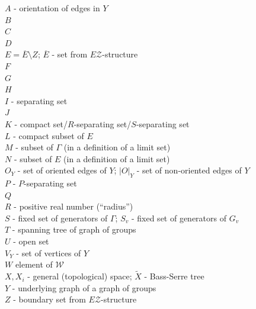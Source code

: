 \documentclass[12pt, a4paper]{article}
\newcommand{\8}{\infty}
\newcommand{\abs}[1]{\left| #1 \right|}
\theoremstyle{break}
\theoremstyle{defbreak}
\newcommand{\ol}[1]{\overline{#1}}
\newcommand{\wtl}[1]{\widetilde{#1}}
\begin{document}
{$A$ - orientation of edges in $Y$\\
$B$\\
$C$\\
$D$\\
$E = \ol{E}\setminus Z$; $\ol{E}$ - set from $E\mathcal{Z}$-structure\\
$F$\\
$G$\\
$H$\\
$I$ - separating set\\
$J$\\
$K$ - compact set/$R$-separating set/$S$-separating set\\
$L$ - compact subset of $E$\\
$M$ - subset of $\Gamma$ (in a definition of a limit set)\\
$N$ - subset of $E$ (in a definition of a limit set)\\
$O_Y$ - set of oriented edges of $Y$; $\abs{O}_Y$ - set of non-oriented edges of $Y$\\
$P$ - $P$-separating set\\
$Q$\\
$R$ - positive real number (``radius'')\\
$S$ - fixed set of generators of $\Gamma$; $S_v$ - fixed set of generators of $G_v$\\
$T$ - spanning tree of graph of groups\\
$U$ - open set\\
$V_Y$ - set of vertices of $Y$\\
$W$ element of $\mathcal{W}$\\
$X, X_i$ - general (topological) space; $\wtl{X}$ - Bass-Serre tree\\
$Y$ - underlying graph of a graph of groups\\
$Z$ - boundary set from $E\mathcal{Z}$-structure

}
\end{document}
